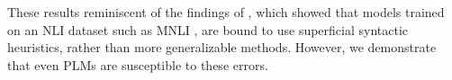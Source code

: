These results reminiscent of the findings of \citet{mccoy2019right}, which showed that models trained on an NLI dataset \cite{dagan-rte,snli} such as MNLI \cite{mnli}, are bound to use superficial syntactic heuristics, rather than more generalizable methods.
However, we demonstrate that even PLMs are susceptible to these errors. 